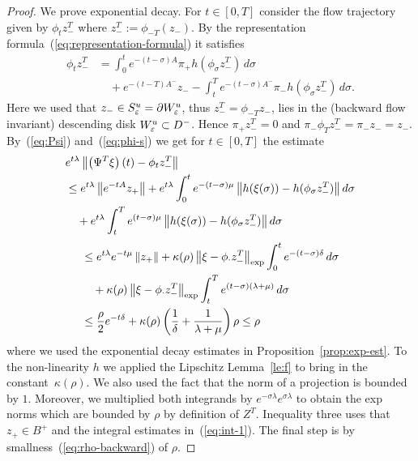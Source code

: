 \documentclass{article}
\begin{document}
\begin{proof}
We prove exponential decay. For $t\in[0,T]$ consider the flow trajectory given by
$\phi_t z_-^T$ where ${z_-^T}:=\phi_{-T}({z_-})$.
By the representation formula~(\ref{eq:representation-formula}) it satisfies
\begin{equation}\label{eq:phi-s}
\begin{split}
     \phi_t{z_-^T}
    &=\int_0^t e^{-(t-\sigma)A}\pi_+
     h(\phi_\sigma {z_-^T})\, d\sigma
   \\
    &\quad
     +e^{-(t-T)A^-}{z_-}
     -\int_t^T e^{-(t-\sigma)A^-}\pi_-
     h(\phi_\sigma {z_-^T})\, d\sigma.
\end{split}
\end{equation}
Here we used that ${z_-}\in S^u_{\varepsilon}={\partial} W^u_{\varepsilon}$, thus
${z_-^T}=\phi_{-T}{z_-}$, lies in the (backward flow invariant) descending
disk $W^u_{\varepsilon}\subset D^-$. Hence $\pi_+{z_-^T}=0$ and $\pi_-\phi_T {z_-^T}=\pi_-{z_-}={z_-}$.
By~(\ref{eq:Psi}) and~(\ref{eq:phi-s}) we get for $t\in[0,T]$ the estimate
\begin{equation}\label{eq:Psixi-bounded}
\begin{split}
    &e^{t\lambda}\Norm{\left(\Psi^T\xi\right)(t)
     -\phi_t{z_-^T}
     }
   \\
    &\le
     e^{t\lambda}\Norm{e^{-tA}z_+}
     +e^{t\lambda}\int_0^t e^{-(t-\sigma)\mu}
     \Norm{h(\xi(\sigma))-h(\phi_\sigma{z_-^T})
     } d\sigma
   \\
    &\quad
     +e^{t\lambda}\int_t^T e^{(t-\sigma)\mu}
     \Norm{h(\xi(\sigma))-h(\phi_\sigma{z_-^T})
     } d\sigma
   \\
\end{split}
\end{equation}
\begin{equation*}
\begin{split}
    &\le e^{t\lambda} e^{-t\mu}\left\|z_+\right\|
     +\kappa(\rho)
     \left\|\xi-\phi_\cdot{z_-^T}\right\|_{\exp}
     \int_0^t
     e^{-(t-\sigma)\delta}
     \, d\sigma
   \\
    &\quad
     +\kappa(\rho)
     \left\|\xi-\phi_\cdot{z_-^T}\right\|_{\exp}
     \int_t^T e^{(t-\sigma)(\lambda+\mu)}
     \, d\sigma
   \\
    &\le
     \frac{\rho}{2} e^{-t\delta}
     +\kappa(\rho)
     \left(\frac{1}{\delta}+\frac{1}{\lambda+\mu}
     \right)\rho
     \le\rho
\end{split}
\end{equation*}
where we used the exponential decay estimates in
Proposition~\ref{prop:exp-est}. To the
non-linearity $h$ we applied the Lipschitz
Lemma~\ref{le:f} to bring in the
constant~$\kappa(\rho)$. We also used the fact that
the norm of a projection is bounded by $1$.
Moreover, we multiplied both
integrands by $e^{-\sigma\lambda} e^{\sigma\lambda}$
to obtain the exp norms which are bounded by
$\rho$ by definition of $Z^T$. Inequality three
uses that $z_+\in B^+$ and the integral
estimates in~(\ref{eq:int-1}). The final step is by
smallness~(\ref{eq:rho-backward}) of $\rho$.
\end{proof}
\end{document}
